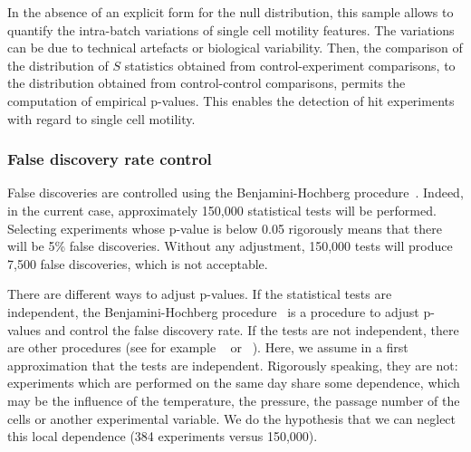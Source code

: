 In the absence of an explicit form for the null distribution, this sample allows to quantify the intra-batch variations of single cell motility features. The variations can be due to technical artefacts or biological variability. Then, the comparison of the distribution of $S$ statistics obtained from control-experiment comparisons, to the distribution obtained from control-control comparisons, permits the computation of empirical p-values. This enables the detection of hit experiments with regard to single cell motility.  

\subsubsection{False discovery rate control}
\label{sec:fdr}
False discoveries are controlled using the Benjamini-Hochberg procedure~\cite{Benjamini1}. Indeed, in the current case, approximately 150,000 statistical tests will be performed. Selecting experiments whose p-value is below 0.05 rigorously means that there will be 5\% false discoveries. Without any adjustment, 150,000 tests will produce 7,500 false discoveries, which is not acceptable. 

There are different ways to adjust p-values. If the statistical tests are independent, the Benjamini-Hochberg procedure~\cite{Benjamini1} is a procedure to adjust p-values and control the false discovery rate. If the tests are not independent, there are other procedures (see for example ~\cite{Benjamini2} or ~\cite{Roquain}). Here, we assume in a first approximation that the tests are independent. Rigorously speaking, they are not: experiments which are performed on the same day share some dependence, which may be the influence of the temperature, the pressure, the passage number of the cells or another experimental variable. We do the hypothesis that we can neglect this local dependence (384 experiments versus 150,000).


